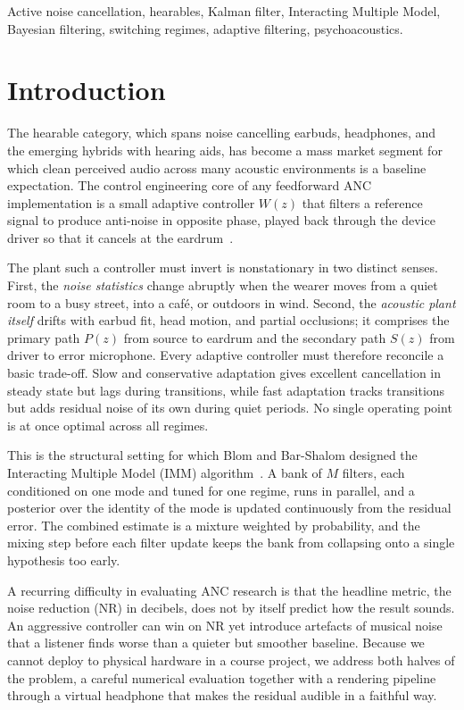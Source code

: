 \documentclass[conference]{IEEEtran}
\begin{document}
\begin{IEEEkeywords}
Active noise cancellation, hearables, Kalman filter, Interacting Multiple Model,
Bayesian filtering, switching regimes, adaptive filtering, psychoacoustics.
\end{IEEEkeywords}

\section{Introduction}

The hearable category, which spans noise cancelling earbuds, headphones, and the
emerging hybrids with hearing aids, has become a mass market segment for which
clean perceived audio across many acoustic environments is a baseline expectation.
The control engineering core of any feedforward ANC implementation is a small
adaptive controller $W(z)$ that filters a reference signal to produce anti-noise in
opposite phase, played back through the device driver so that it cancels at the
eardrum~\cite{Kuo:ANC1996}.

The plant such a controller must invert is nonstationary in two distinct senses.
First, the \textit{noise statistics} change abruptly when the wearer moves from a
quiet room to a busy street, into a caf\'e, or outdoors in wind. Second, the
\textit{acoustic plant itself} drifts with earbud fit, head motion, and partial
occlusions; it comprises the primary path $P(z)$ from source to eardrum and the
secondary path $S(z)$ from driver to error microphone. Every adaptive controller
must therefore reconcile a basic trade-off. Slow and conservative adaptation gives
excellent cancellation in steady state but lags during transitions, while fast
adaptation tracks transitions but adds residual noise of its own during quiet
periods. No single operating point is at once optimal across all regimes.

This is the structural setting for which Blom and Bar-Shalom designed the
Interacting Multiple Model (IMM) algorithm~\cite{BarShalom:imm88}. A bank of $M$
filters, each conditioned on one mode and tuned for one regime, runs in parallel,
and a posterior over the identity of the mode is updated continuously from the
residual error. The combined estimate is a mixture weighted by probability, and the
mixing step before each filter update keeps the bank from collapsing onto a single
hypothesis too early.

A recurring difficulty in evaluating ANC research is that the headline metric, the
noise reduction (NR) in decibels, does not by itself predict how the result sounds.
An aggressive controller can win on NR yet introduce artefacts of musical noise
that a listener finds worse than a quieter but smoother baseline. Because we cannot
deploy to physical hardware in a course project, we address both halves of the
problem, a careful numerical evaluation together with a rendering pipeline through a
virtual headphone that makes the residual audible in a faithful way.
\end{document}
